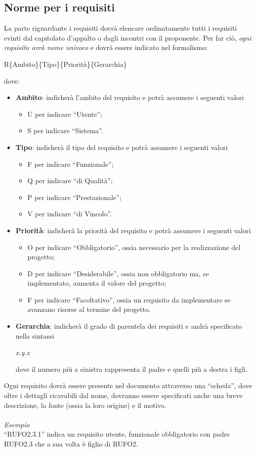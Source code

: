 \subsection{Norme per i requisiti}
La parte riguardante i requisiti dovrà elencare ordinatamente tutti i requisiti evinti dal capitolato d'appalto o dagli incontri con il proponente. Per far ciò, \textit{ogni requisito avrà nome univoco} e dovrà essere indicato nel formalismo:
\begin{center}
R\{Ambito\}\{Tipo\}\{Priorità\}\{Gerarchia\}
\end{center}
dove:
\begin{itemize}
\item \textbf{Ambito}: indicherà l'ambito del requisito e potrà assumere i seguenti valori
\begin{itemize}
\item U per indicare ``Utente'';
\item S per indicare ``Sistema''.
\end{itemize}
\item \textbf{Tipo}: indicherà il tipo del requisito e potrà assumere i seguenti valori
\begin{itemize}
\item F per indicare ``Funzionale'';
\item Q per indicare ``di Qualità'';
\item P per indicare ``Prestazionale'';
\item V per indicare ``di Vincolo''.
\end{itemize}
\item \textbf{Priorità}: indicherà la priorità del requisito e potrà assumere i seguenti valori
\begin{itemize}
\item O per indicare ``Obbligatorio'', ossia necessario per la realizzazione del progetto;
\item D per indicare ``Desiderabile'', ossia non obbligatorio ma, se implementato, aumenta il valore del progetto;
\item F per indicare ``Facoltativo'', ossia un requisito da implementare se avanzano risorse al termine del progetto.
\end{itemize}
\item \textbf{Gerarchia}: indicherà il grado di parentela dei requisiti e andrà specificato nella sintassi
\begin{center}
\textit{x.y.z}
\end{center}
dove il numero più a sinistra rappresenta il padre e quelli più a destra i figli.
\end{itemize}
Ogni requisito dovrà essere presente nel documento attraverso una ``scheda'', dove oltre i dettagli ricavabili dal nome, dovranno essere specificati anche una breve descrizione, la fonte (ossia la loro origine) e il motivo.\\\\
\textit{Esempio}\\
``RUFO2.3.1'' indica un requisito utente, funzionale obbligatorio con padre RUFO2.3 che a sua volta è figlio di RUFO2.


